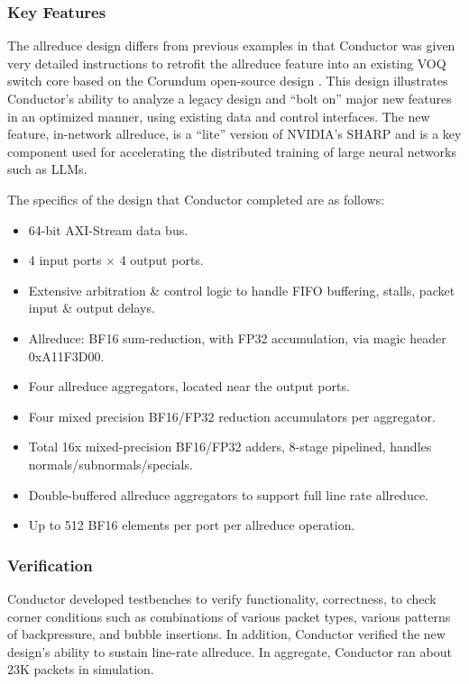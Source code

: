 \subsubsection{Key Features}

The allreduce design differs from previous examples in that Conductor was given very detailed instructions to retrofit the allreduce feature into an existing VOQ switch core based on the Corundum open-source design \cite{corundum_ethernet_switch}. This design illustrates Conductor's ability to analyze a legacy design and ``bolt on'' major new features in an optimized manner, using existing data and control interfaces. The new feature, in-network allreduce, is a ``lite'' version of NVIDIA's SHARP \cite{graham2016scalable} and is a key component used for accelerating the distributed training of large neural networks such as LLMs.

The specifics of the design that Conductor completed are as follows:

\begin{itemize}
	\item 64-bit AXI-Stream data bus.
	\item 4 input ports × 4 output ports.
	\item Extensive arbitration \& control logic to handle FIFO buffering, stalls, packet input \& output delays.
	\item Allreduce: BF16 sum-reduction, with FP32 accumulation, via magic header 0xA11F3D00.
	\item Four allreduce aggregators, located near the output ports.
	\item Four mixed precision BF16/FP32 reduction accumulators per aggregator.
	\item Total 16x mixed-precision BF16/FP32 adders, 8-stage pipelined, handles normals/subnormals/specials.
	\item Double-buffered allreduce aggregators to support full line rate allreduce.
	\item Up to 512 BF16 elements per port per allreduce operation.\\
\end{itemize}

\subsubsection{Verification}

Conductor developed testbenches to verify functionality, correctness, to check corner conditions such as combinations of various packet types, various patterns of backpressure, and bubble insertions.
In addition, Conductor verified the new design's ability to sustain line-rate allreduce. In aggregate, Conductor ran about 23K packets in simulation.

